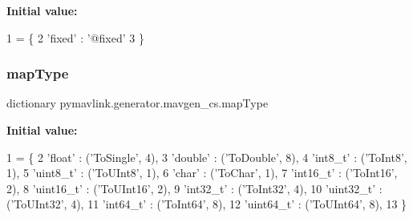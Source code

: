 {\bfseries Initial value\+:}
\begin{DoxyCode}
1 =  \{
2         \textcolor{stringliteral}{'fixed'}    : \textcolor{stringliteral}{'@fixed'}
3         \}
\end{DoxyCode}
\mbox{\label{namespacepymavlink_1_1generator_1_1mavgen__cs_ac5f9ceb669ed4c71b42212ce69020f92}} 
\subsubsection{\texorpdfstring{map\+Type}{mapType}}
{\footnotesize\ttfamily dictionary pymavlink.\+generator.\+mavgen\+\_\+cs.\+map\+Type}

{\bfseries Initial value\+:}
\begin{DoxyCode}
1 =  \{
2         \textcolor{stringliteral}{'float'}    : (\textcolor{stringliteral}{'ToSingle'}, 4),
3         \textcolor{stringliteral}{'double'}   : (\textcolor{stringliteral}{'ToDouble'}, 8),
4         \textcolor{stringliteral}{'int8\_t'}   : (\textcolor{stringliteral}{'ToInt8'}, 1),
5         \textcolor{stringliteral}{'uint8\_t'}   : (\textcolor{stringliteral}{'ToUInt8'}, 1),
6         \textcolor{stringliteral}{'char'}   :   (\textcolor{stringliteral}{'ToChar'}, 1),
7         \textcolor{stringliteral}{'int16\_t'}  : (\textcolor{stringliteral}{'ToInt16'}, 2),
8         \textcolor{stringliteral}{'uint16\_t'} : (\textcolor{stringliteral}{'ToUInt16'}, 2),
9         \textcolor{stringliteral}{'int32\_t'}  : (\textcolor{stringliteral}{'ToInt32'}, 4),
10         \textcolor{stringliteral}{'uint32\_t'} : (\textcolor{stringliteral}{'ToUInt32'}, 4),
11         \textcolor{stringliteral}{'int64\_t'}  : (\textcolor{stringliteral}{'ToInt64'}, 8),
12         \textcolor{stringliteral}{'uint64\_t'} : (\textcolor{stringliteral}{'ToUInt64'}, 8),
13         \}
\end{DoxyCode}
